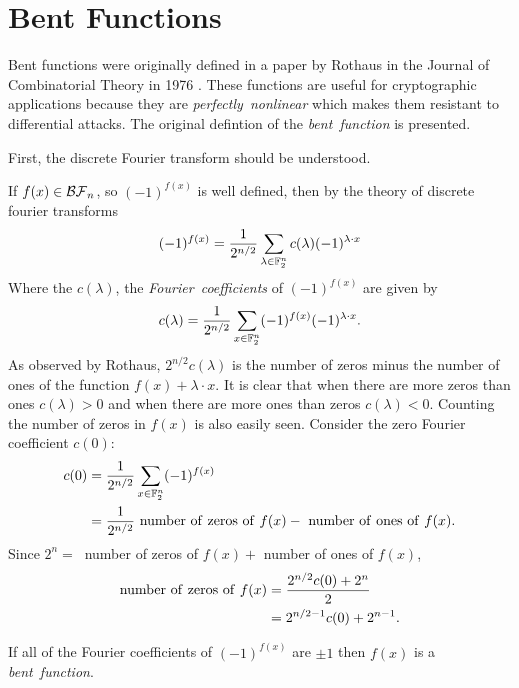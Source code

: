 \section{Bent Functions}
\par Bent functions were originally defined in a paper by Rothaus in the Journal
of Combinatorial Theory in 1976 \cite{art:r76}. These functions are useful for
cryptographic applications because they are {\em perfectly\ nonlinear} which
makes them resistant to differential attacks. The original defintion of the
{\em bent\ function} is presented.

\par First, the discrete Fourier transform should be understood.



\par If $f(x)\in\mathcal{BF}_n$, so $(-1)^{f(x)}$ is well defined, then by the
theory of discrete fourier transforms
\begin{equation}\label{eqn:DFT}
  (-1)^{f(x)}=\frac{1}{2^{n/2}}\sum_{\lambda\in\mathbb{F}_2^n}c(\lambda)(-1)^{\lambda\cdot x}
\end{equation}
Where the $c(\lambda)$, the {\em Fourier\ coefficients} of $(-1)^{f(x)}$ are given by
\[
  c(\lambda)=\frac{1}{2^{n/2}}\sum_{x\in\mathbb{F}_2^n}(-1)^{f(x)}(-1)^{\lambda\cdot x}.
\]
As observed by Rothaus, $2^{n/2}c(\lambda)$ is the number of zeros minus the number
of ones of the function $f(x)+\lambda\cdot x$. It is clear that when there are more
zeros than ones $c(\lambda)>0$ and when there are more ones than zeros $c(\lambda)<0$.
Counting the number of zeros in $f(x)$ is also easily seen. Consider the zero Fourier
coefficient $c(0)$:
\begin{align*}
	c(0)&=\frac{1}{2^{n/2}}\sum_{x\in\gftwo^n}(-1)^{f(x)}\\
	&=\frac{1}{2^{n/2}}{\rm \ number\ of\ zeros\ of\ }f(x)-{\rm \ number\ of \ ones\ of \ }f(x).
\end{align*}
Since $2^n=\ $ number of zeros of $f(x)+$ number of ones of $f(x)$,
\begin{align*}
	{\rm number\ of\ zeros\ of\ }f(x)&=\frac{2^{n/2}c(0)+2^n}{2}\\
	                                 &=2^{n/2-1}c(0)+2^{n-1}.
\end{align*}

\begin{definition}\label{def:bent-function}
  If all of the Fourier coefficients of $(-1)^{f(x)}$ are $\pm1$ then
  $f(x)$ is a {\em bent\ function}.
\end{definition}

